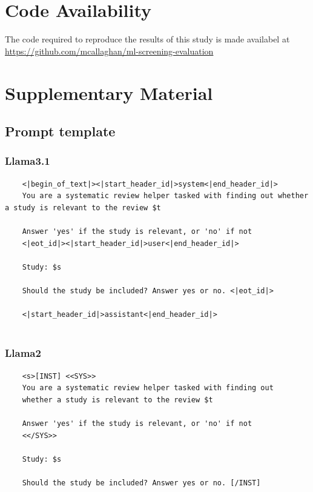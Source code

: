 \documentclass{article}
\begin{document}
    \section*{Code Availability}

    The code required to reproduce the results of this study is made availabel at \url{https://github.com/mcallaghan/ml-screening-evaluation}
	
	
	

        \printbibliography
	
	\appendix
	
	\section*{Supplementary Material}
	
	\subsection*{Prompt template}

        \subsubsection*{Llama3.1}

        \begin{verbatim}
    <|begin_of_text|><|start_header_id|>system<|end_header_id|>
    You are a systematic review helper tasked with finding out whether a study is relevant to the review $t

    Answer 'yes' if the study is relevant, or 'no' if not
    <|eot_id|><|start_header_id|>user<|end_header_id|>

    Study: $s 

    Should the study be included? Answer yes or no. <|eot_id|>

    <|start_header_id|>assistant<|end_header_id|>
        
        \end{verbatim}



        \subsubsection*{Llama2}
        \begin{verbatim}
    <s>[INST] <<SYS>>
    You are a systematic review helper tasked with finding out 
    whether a study is relevant to the review $t
    
    Answer 'yes' if the study is relevant, or 'no' if not
    <</SYS>>
    
    Study: $s 
    
    Should the study be included? Answer yes or no. [/INST] 
        \end{verbatim}
	
	
\end{document}
